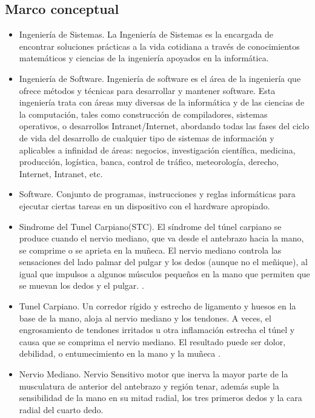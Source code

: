 \documentclass[a4paper,man,natbib]{apa6}
\begin{document}
\subsection{Marco conceptual}
\begin{itemize}
\item Ingeniería de Sistemas.
La Ingeniería de Sistemas es la encargada de encontrar soluciones prácticas a la vida cotidiana a través de conocimientos matemáticos y ciencias de la ingeniería apoyados en la informática. \cite{f5}
\item Ingeniería de Software.
Ingeniería de software es el área de la ingeniería que ofrece métodos y técnicas para desarrollar y mantener software.
Esta ingeniería trata con áreas muy diversas de la informática y de las ciencias de la computación, tales como construcción de compiladores, sistemas operativos, o desarrollos Intranet/Internet, abordando todas las fases del ciclo de vida del desarrollo de cualquier tipo de sistemas de información y aplicables a infinidad de áreas: negocios, investigación científica, medicina, producción, logística, banca, control de tráfico, meteorología, derecho, Internet, Intranet, etc. \cite{f6}
\item Software.
Conjunto de programas, instrucciones y reglas informáticas para ejecutar ciertas tareas en un dispositivo con el hardware apropiado. \cite{f7}
\item Sindrome del Tunel Carpiano(STC).
El síndrome del túnel carpiano se produce cuando el nervio mediano, que va desde el antebrazo hacia la mano, se comprime o se aprieta en la muñeca. El nervio mediano controla las sensaciones del lado palmar del pulgar y los dedos (aunque no el meñique), al igual que impulsos a algunos músculos pequeños en la mano que permiten que se muevan los dedos y el pulgar. \cite{f8}.

\item Tunel Carpiano.
Un corredor rígido y estrecho de ligamento y huesos en la base de la mano, aloja al nervio mediano y los tendones. A veces, el engrosamiento de tendones irritados u otra inflamación estrecha el túnel y causa que se comprima el nervio mediano. El resultado puede ser dolor, debilidad, o entumecimiento en la mano y la muñeca \cite{f8}.

\item Nervio Mediano.
Nervio Sensitivo motor que inerva la mayor parte de la musculatura de anterior del antebrazo y región tenar, además suple la sensibilidad de la mano en su mitad radial, los tres primeros dedos y la cara radial del cuarto dedo. \cite{f9}


\end{itemize}
\end{document}
